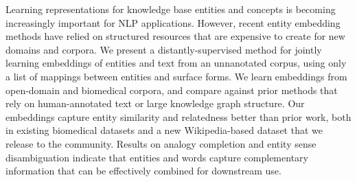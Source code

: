 Learning representations for knowledge base entities and concepts is becoming increasingly important for NLP applications.  However, recent entity embedding methods have relied on structured resources that are expensive to create for new domains and corpora.  We present a distantly-supervised method for jointly learning embeddings of entities and text from an unnanotated corpus, using only a list of mappings between entities and surface forms.  We learn embeddings from open-domain and biomedical corpora, and compare against prior methods that rely on human-annotated text or large knowledge graph structure.  Our embeddings capture entity similarity and relatedness better than prior work, both in existing biomedical datasets and a new Wikipedia-based dataset that we release to the community. Results on analogy completion and entity sense disambiguation indicate that entities and words capture complementary information that can be effectively combined for downstream use.

